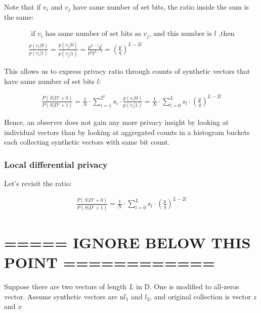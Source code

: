 \documentclass[11pt,draft]{article}
\begin{document}
Note that if $v_i$ and $v_j$ have same number of set bits, the ratio inside the sum is the same:

\begin{align}
\text { if } v_i \text { has same number of set bits as } v_j \text{, and this number is  } l \text{ ,then}  \\
\frac{p(v_i|0)}{p(v_i|1)}  = \frac{p(v_j|0)}{p(v_j|1)} = \frac{p^{L-l}q^l }{p^lq^{L-l}} = \left ( \frac{p}{q} \right )^ {L - 2l}
\end{align}

This allows us to express privacy ratio through counts of synthetic vectors that have same number of set bits $l$:

\begin{align}
\frac{P(S|D'+0)}{P(S|D'+1)} = \frac{1}{N}  \cdot  \sum_{i=1}^{2^L} s_i  \cdot \frac{p(v_i|0)}{p(v_i|1)}  =  \frac{1}{N}   \cdot  \sum_{l=0}^{L} s_l \cdot  \left ( \frac{p}{q} \right )^ {L - 2l}
\end{align}

Hence, an observer does not gain any more privacy insight by looking at individual vectors than by looking at aggregated counts in a histogram buckets each collecting synthetic vectors with same bit count. 

\subsubsection{Local differential privacy}

Let's revisit the ratio:

\begin{align}
\frac{P(S|D'+0)}{P(S|D'+1)} = \frac{1}{N}   \cdot  \sum_{l=0}^{L} s_l \cdot  \left ( \frac{p}{q} \right )^ {L - 2l}
\end{align}



\section{===== IGNORE BELOW THIS POINT  ============}

Suppose there are two vectors of length $L$ in D.  One is modified to all-zeros vector.  
Assume synthetic vectors are n$l_1$ and $l_2$, and original collection is vector $z$ and $x$
\end{document}
